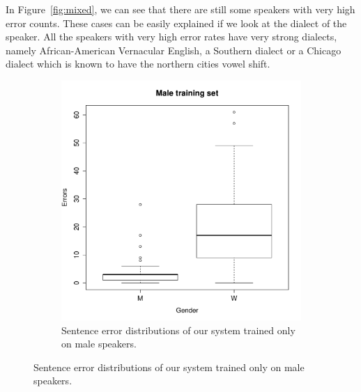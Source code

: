 \documentclass[twocolumn, 11pt]{article}
\begin{document}
In Figure~\ref{fig:mixed}, we can see that there are still some speakers with
very high error counts.  These cases can be easily explained if we look at the
dialect of the speaker. All the speakers with very high error rates have very
strong dialects, namely African-American Vernacular English, a Southern dialect
or a Chicago dialect which is known to have the northern cities vowel shift.

\begin{figure}[h]
  \begin{subfigure}{\columnwidth}
    \includegraphics[width=\columnwidth]{male_only.pdf}
    \caption{\label{fig:male} Sentence error distributions of our system trained only on male speakers.}
  \end{subfigure}
\end{figure}
\end{document}
